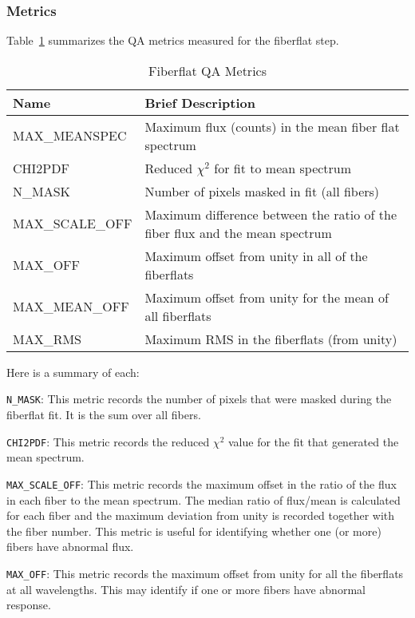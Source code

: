 \documentclass[12pt]{article}
\begin{document}
\subsubsection{Metrics}

Table~\ref{tab:flat_metrics} summarizes the QA metrics measured
for the fiberflat step.  

\begin{table}[h]
\begin{center}
\caption{Fiberflat QA Metrics}
\label{tab:flat_metrics}
\begin{tabular}{p{3.5cm}p{9.0cm}}
\hline
{\bf Name} & {\bf Brief Description}\\
\hline
MAX\_MEANSPEC   & Maximum flux (counts) in the mean fiber flat spectrum \\ 
CHI2PDF         & Reduced $\chi^2$ for fit to mean spectrum \\
N\_MASK         & Number of pixels masked in fit (all fibers) \\
MAX\_SCALE\_OFF & Maximum difference between the ratio of the fiber flux and 
  the mean spectrum \\
MAX\_OFF        & Maximum offset from unity in all of the fiberflats \\
MAX\_MEAN\_OFF  & Maximum offset from unity for the mean of all fiberflats \\
MAX\_RMS        & Maximum RMS in the fiberflats (from unity) \\
\hline
\end{tabular}
\end{center}
\end{table}


\noindent
Here is a summary of each:

\vskip 0.2in

\noindent
{\tt N\_MASK}:  This metric records the number of pixels that were
masked during the fiberflat fit.  It is the sum over all fibers.

\noindent
{\tt CHI2PDF}:  This metric records the reduced $\chi^2$ value 
for the fit that generated the mean spectrum.

\noindent
{\tt MAX\_SCALE\_OFF}:  This metric records the maximum offset 
in the ratio of the flux in each fiber to the mean spectrum.
The median ratio of flux/mean
is calculated for each fiber and the maximum
deviation from unity is recorded together with the fiber number.  
This metric is useful for
identifying whether one (or more) fibers have abnormal flux.

\noindent
{\tt MAX\_OFF}:  This metric records the maximum offset from
unity for all the fiberflats at all wavelengths.  
This may identify if one or more fibers have abnormal response.
\end{document}
